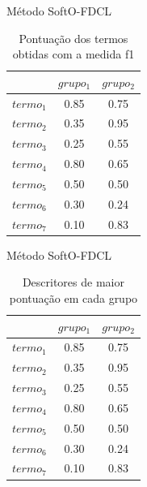 \documentclass[brazil]{beamer}
\begin{document}
\begin{frame}{Método SoftO-FDCL \cite{Nogueira2013}}
  \begin{table}[!htp]
    \centering
    \begin{tabular}{ |c|c|c|}
      \hline
      & $grupo_1$ & $grupo_2$ \\
      \hline
      $termo_1$ & 0.85 & 0.75 \\
      \hline
      $termo_2$ & 0.35 & 0.95 \\
      \hline
      $termo_3$ & 0.25 & 0.55 \\
      \hline
      $termo_4$ & 0.80 & 0.65 \\
      \hline
      $termo_5$ & 0.50 & 0.50 \\
      \hline
      $termo_6$ & 0.30 & 0.24 \\
      \hline
      $termo_7$ & 0.10 & 0.83 \\
      \hline
    \end{tabular}
    \caption{Pontuação dos termos obtidas com a medida f1}
  \end{table}
\end{frame}

\begin{frame}{Método SoftO-FDCL \cite{Nogueira2013}}
  \begin{table}[!htp]
    \centering
    \begin{tabular}{ |c|c|c|}
      \hline
      & $grupo_1$ & $grupo_2$ \\
      \hline
      $termo_1$ & {\color{red}0.85} & 0.75 \\
      \hline
      $termo_2$ & 0.35 & {\color{blue}0.95} \\
      \hline
      $termo_3$ & 0.25 & {\color{blue}0.55} \\
      \hline
      $termo_4$ & {\color{red}0.80} & 0.65 \\
      \hline
      $termo_5$ & \alert{0.50} & 0.50 \\
      \hline
      $termo_6$ & 0.30 & 0.24 \\
      \hline
      $termo_7$ & 0.10 & {\color{blue}0.83} \\
      \hline
    \end{tabular}
    \caption{Descritores de maior pontuação em cada grupo}
  \end{table}
\end{frame}
\end{document}
